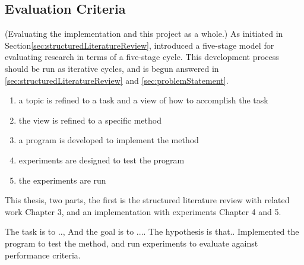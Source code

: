 \subsection{Evaluation Criteria}

(Evaluating the implementation and this project as a whole.)
As initiated in Section\vref{sec:structuredLiteratureReview}, \citet{cohen88} introduced a five-stage model for evaluating research in terms of a five-stage cycle. This development process should be run as iterative cycles, and is begun answered in \vref{sec:structuredLiteratureReview} and \vref{sec:problemStatement}.
\begin{enumerate}
\item a topic is refined to a task and a view of how to accomplish the task
\item the view is refined to a specific method
\item a program is developed to implement the method
\item experiments are designed to test the program
\item the experiments are run
\end{enumerate} 

This thesis, two parts, the first is the structured literature review with related work Chapter 3, and an implementation with experiments Chapter 4 and 5. 

The task is to .., And the goal is to .... The hypothesis is that.. Implemented the program to test the method, and run experiments to evaluate against performance criteria.